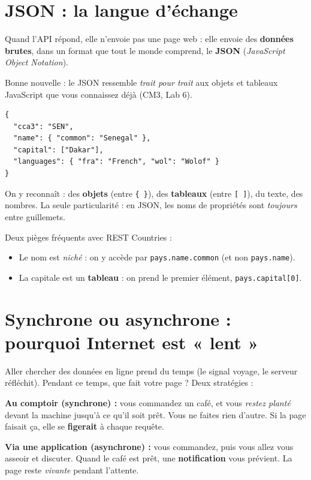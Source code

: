 \documentclass[11pt,a4paper]{article}
\newcommand{\code}[1]{\texttt{#1}}
\begin{document}
\section{JSON : la langue d'échange}

Quand l'API répond, elle n'envoie pas une page web : elle envoie des \textbf{données brutes}, dans un format que tout le monde comprend, le \textbf{JSON} (\emph{JavaScript Object Notation}).

Bonne nouvelle : le JSON ressemble \emph{trait pour trait} aux objets et tableaux JavaScript que vous connaissez déjà (CM3, Lab 6).

\begin{lstlisting}[style=js]
{
  "cca3": "SEN",
  "name": { "common": "Senegal" },
  "capital": ["Dakar"],
  "languages": { "fra": "French", "wol": "Wolof" }
}
\end{lstlisting}

On y reconnaît : des \textbf{objets} (entre \code{\{ \}}), des \textbf{tableaux} (entre \code{[ ]}), du texte, des nombres. La seule particularité : en JSON, les noms de propriétés sont \emph{toujours} entre guillemets.

\begin{attentionbox}
Deux pièges fréquents avec REST Countries :
\begin{itemize}[leftmargin=*,noitemsep]
  \item Le nom est \emph{niché} : on y accède par \code{pays.name.common} (et non \code{pays.name}).
  \item La capitale est un \textbf{tableau} : on prend le premier élément, \code{pays.capital[0]}.
\end{itemize}
\end{attentionbox}

\section{Synchrone ou asynchrone : pourquoi Internet est « lent »}

Aller chercher des données en ligne prend du temps (le signal voyage, le serveur réfléchit). Pendant ce temps, que fait votre page ? Deux stratégies :

\begin{infobox}
\textbf{Au comptoir (synchrone) :} vous commandez un café, et vous \emph{restez planté} devant la machine jusqu'à ce qu'il soit prêt. Vous ne faites rien d'autre. Si la page faisait ça, elle se \textbf{figerait} à chaque requête.

\smallskip
\textbf{Via une application (asynchrone) :} vous commandez, puis vous allez vous asseoir et discuter. Quand le café est prêt, une \textbf{notification} vous prévient. La page reste \emph{vivante} pendant l'attente.
\end{infobox}
\end{document}
